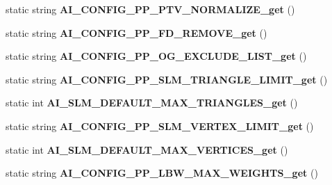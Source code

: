 \begin{DoxyCompactItemize}
\item 
\hypertarget{class_assimp_p_i_n_v_o_k_e_ac3fa39164b6f46d8c9c00762a6c03c1d}{static string {\bfseries A\+I\+\_\+\+C\+O\+N\+F\+I\+G\+\_\+\+P\+P\+\_\+\+P\+T\+V\+\_\+\+N\+O\+R\+M\+A\+L\+I\+Z\+E\+\_\+get} ()}\label{class_assimp_p_i_n_v_o_k_e_ac3fa39164b6f46d8c9c00762a6c03c1d}

\item 
\hypertarget{class_assimp_p_i_n_v_o_k_e_a088b54d57d2a363e69f2a0c725c183a7}{static string {\bfseries A\+I\+\_\+\+C\+O\+N\+F\+I\+G\+\_\+\+P\+P\+\_\+\+F\+D\+\_\+\+R\+E\+M\+O\+V\+E\+\_\+get} ()}\label{class_assimp_p_i_n_v_o_k_e_a088b54d57d2a363e69f2a0c725c183a7}

\item 
\hypertarget{class_assimp_p_i_n_v_o_k_e_acf57f35269644fbfdd686ec6c2de6dba}{static string {\bfseries A\+I\+\_\+\+C\+O\+N\+F\+I\+G\+\_\+\+P\+P\+\_\+\+O\+G\+\_\+\+E\+X\+C\+L\+U\+D\+E\+\_\+\+L\+I\+S\+T\+\_\+get} ()}\label{class_assimp_p_i_n_v_o_k_e_acf57f35269644fbfdd686ec6c2de6dba}

\item 
\hypertarget{class_assimp_p_i_n_v_o_k_e_acef18d786c9e688da5db284e0100a1b0}{static string {\bfseries A\+I\+\_\+\+C\+O\+N\+F\+I\+G\+\_\+\+P\+P\+\_\+\+S\+L\+M\+\_\+\+T\+R\+I\+A\+N\+G\+L\+E\+\_\+\+L\+I\+M\+I\+T\+\_\+get} ()}\label{class_assimp_p_i_n_v_o_k_e_acef18d786c9e688da5db284e0100a1b0}

\item 
\hypertarget{class_assimp_p_i_n_v_o_k_e_a7bde6032abbd414c9ff8a532df6e41aa}{static int {\bfseries A\+I\+\_\+\+S\+L\+M\+\_\+\+D\+E\+F\+A\+U\+L\+T\+\_\+\+M\+A\+X\+\_\+\+T\+R\+I\+A\+N\+G\+L\+E\+S\+\_\+get} ()}\label{class_assimp_p_i_n_v_o_k_e_a7bde6032abbd414c9ff8a532df6e41aa}

\item 
\hypertarget{class_assimp_p_i_n_v_o_k_e_ac77e91a27e7c1de41ad5d5f600b308f6}{static string {\bfseries A\+I\+\_\+\+C\+O\+N\+F\+I\+G\+\_\+\+P\+P\+\_\+\+S\+L\+M\+\_\+\+V\+E\+R\+T\+E\+X\+\_\+\+L\+I\+M\+I\+T\+\_\+get} ()}\label{class_assimp_p_i_n_v_o_k_e_ac77e91a27e7c1de41ad5d5f600b308f6}

\item 
\hypertarget{class_assimp_p_i_n_v_o_k_e_ac70952f93d0ba458b84595709ffd0c5b}{static int {\bfseries A\+I\+\_\+\+S\+L\+M\+\_\+\+D\+E\+F\+A\+U\+L\+T\+\_\+\+M\+A\+X\+\_\+\+V\+E\+R\+T\+I\+C\+E\+S\+\_\+get} ()}\label{class_assimp_p_i_n_v_o_k_e_ac70952f93d0ba458b84595709ffd0c5b}

\item 
\hypertarget{class_assimp_p_i_n_v_o_k_e_a7ef628d1859f83edb7defb3eb7337315}{static string {\bfseries A\+I\+\_\+\+C\+O\+N\+F\+I\+G\+\_\+\+P\+P\+\_\+\+L\+B\+W\+\_\+\+M\+A\+X\+\_\+\+W\+E\+I\+G\+H\+T\+S\+\_\+get} ()}\label{class_assimp_p_i_n_v_o_k_e_a7ef628d1859f83edb7defb3eb7337315}


\end{DoxyCompactItemize}
